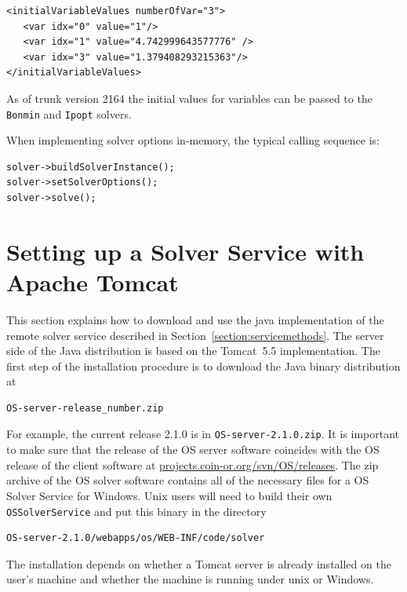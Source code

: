 \documentclass[11pt]{article}
\renewcommand{\_}{{\char"5F}}
\renewcommand{\{}{{\char"7B}}
\renewcommand{\}}{{\char"7D}}
\renewcommand{\^}{{\char"0D}}
\renewcommand{\'}{{\char"0D}}
\begin{document}
\begin{enumerate}[Step 1:]
\begin{verbatim}
<initialVariableValues numberOfVar="3">
   <var idx="0" value="1"/>
   <var idx="1" value="4.742999643577776" />
   <var idx="3" value="1.379408293215363"/>
</initialVariableValues>
\end{verbatim}

As of trunk version 2164 the initial values for variables can be passed
to the {\tt Bonmin} and {\tt Ipopt} solvers.


When implementing solver options in-memory, the typical calling sequence is:

\begin{verbatim}
solver->buildSolverInstance();
solver->setSolverOptions();
solver->solve();
\end{verbatim}






\section{Setting up a Solver Service with Apache Tomcat}\label{section:tomcat}

This section explains how to download and use the java implementation of the remote solver service 
described in Section~\ref{section:servicemethods}.
The server side of the Java distribution is based on the Tomcat~5.5 implementation. 
The first step of the installation procedure is to download the Java binary distribution at
\begin{verbatim}
OS-server-release_number.zip
\end{verbatim}

For example, the current release 2.1.0 is in {\tt OS-server-2.1.0.zip}.  It is important to make sure that the release of the OS server software coincides with the OS release of the client software at \url{projects.coin-or.org/svn/OS/releases}.
The  zip archive of the OS solver software contains all of the necessary files for a OS Solver Service for Windows.  Unix users will need to build their own {\tt OSSolverService}  and put this binary in the directory
\begin{verbatim}
OS-server-2.1.0/webapps/os/WEB-INF/code/solver 
\end{verbatim}


The installation depends on
whether a Tomcat server is already installed on the user's machine and whether the machine is running
under unix or Windows.


\end{enumerate}
\end{document}
